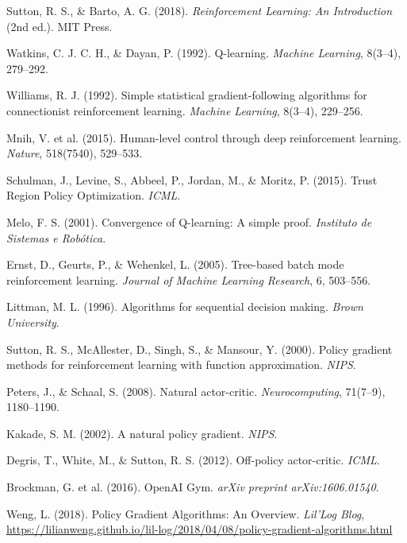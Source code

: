 \documentclass[conference]{IEEEtran}
\begin{document}
\begin{thebibliography}{99}

 Sutton, R. S., \& Barto, A. G. (2018). \textit{Reinforcement Learning: An Introduction} (2nd ed.). MIT Press.

 Watkins, C. J. C. H., \& Dayan, P. (1992). Q-learning. \textit{Machine Learning}, 8(3–4), 279–292.

 Williams, R. J. (1992). Simple statistical gradient-following algorithms for connectionist reinforcement learning. \textit{Machine Learning}, 8(3–4), 229–256.

 Mnih, V. et al. (2015). Human-level control through deep reinforcement learning. \textit{Nature}, 518(7540), 529–533.

 Schulman, J., Levine, S., Abbeel, P., Jordan, M., \& Moritz, P. (2015). Trust Region Policy Optimization. \textit{ICML}.

 Melo, F. S. (2001). Convergence of Q-learning: A simple proof. \textit{Instituto de Sistemas e Robótica}.

 Ernst, D., Geurts, P., \& Wehenkel, L. (2005). Tree-based batch mode reinforcement learning. \textit{Journal of Machine Learning Research}, 6, 503–556.

 Littman, M. L. (1996). Algorithms for sequential decision making. \textit{Brown University}.

 Sutton, R. S., McAllester, D., Singh, S., \& Mansour, Y. (2000). Policy gradient methods for reinforcement learning with function approximation. \textit{NIPS}.

 Peters, J., \& Schaal, S. (2008). Natural actor-critic. \textit{Neurocomputing}, 71(7–9), 1180–1190.

 Kakade, S. M. (2002). A natural policy gradient. \textit{NIPS}.

 Degris, T., White, M., \& Sutton, R. S. (2012). Off-policy actor-critic. \textit{ICML}.

 Brockman, G. et al. (2016). OpenAI Gym. \textit{arXiv preprint arXiv:1606.01540}.

 Weng, L. (2018). Policy Gradient Algorithms: An Overview. \textit{Lil'Log Blog}, \url{https://lilianweng.github.io/lil-log/2018/04/08/policy-gradient-algorithms.html}


\end{thebibliography}
\end{document}

